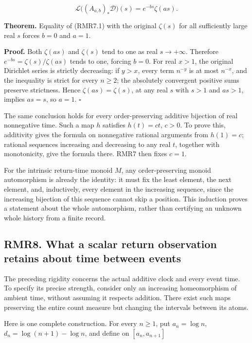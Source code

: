 \documentclass[
]{article}
\begin{document}
\[
\mathcal L\bigl((A_{a,b})_*\mathcal D\bigr)(s)
=e^{-bs}\zeta(as).
\tag{RMR7.1}
\]

\textbf{Theorem.} Equality of (RMR7.1) with the original \(\zeta(s)\)
for all sufficiently large real \(s\) forces \(b=0\) and \(a=1\).

\textbf{Proof.} Both \(\zeta(as)\) and \(\zeta(s)\) tend to one as real
\(s\to+\infty\). Therefore \(e^{-bs}=\zeta(s)/\zeta(as)\) tends to one,
forcing \(b=0\). For real \(x>1\), the original Dirichlet series is
strictly decreasing: if \(y>x\), every term \(n^{-y}\) is at most
\(n^{-x}\), and the inequality is strict for every \(n\ge2\); the
absolutely convergent positive sums preserve strictness. Hence
\(\zeta(as)=\zeta(s)\), at any real \(s\) with \(s>1\) and \(as>1\),
implies \(as=s\), so \(a=1\). \(\square\)

The same conclusion holds for every order-preserving additive bijection
of real nonnegative time. Such a map \(h\) satisfies \(h(t)=ct\),
\(c>0\). To prove this, additivity gives the formula on nonnegative
rational arguments from \(h(1)=c\); rational sequences increasing and
decreasing to any real \(t\), together with monotonicity, give the
formula there. RMR7 then fixes \(c=1\).

For the intrinsic return-time monoid \(M\), any order-preserving monoid
automorphism is already the identity: it must fix the least element, the
next element, and, inductively, every element in the increasing
sequence, since the increasing bijection of this sequence cannot skip a
position. This induction proves a statement about the whole
automorphism, rather than certifying an unknown whole history from a
finite record.

\subsection{RMR8. What a scalar return observation retains about time
between
events}\label{rmr8.-what-a-scalar-return-observation-retains-about-time-between-events}

The preceding rigidity concerns the actual additive clock and every
event time. To specify its precise strength, consider only an increasing
homeomorphism of ambient time, without assuming it respects addition.
There exist such maps preserving the entire count measure but changing
the intervals between its atoms.

Here is one complete construction. For every \(n\ge1\), put
\(a_n=\log n\), \(d_n=\log(n+1)-\log n\), and define on
\([a_n,a_{n+1}]\)
\end{document}
